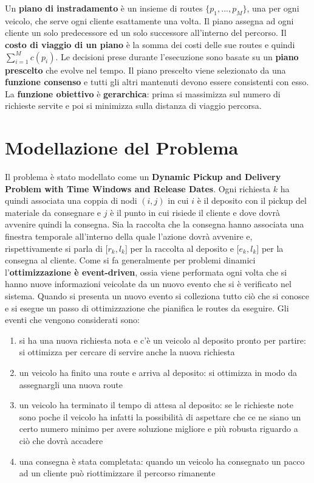 \documentclass[
    article,            %
    12pt,                %
    oneside,            %
    a4paper,            %
    english,            %
    italian,                %
    sumario=tradicional,
]{abntex2}
\begin{document}
\newline
Un \textbf{piano di instradamento} è un insieme di routes $\{p_1,...,p_M\}$, una per ogni veicolo, che serve ogni cliente esattamente una volta. Il piano assegna ad ogni cliente un solo predecessore ed un solo successore all'interno del percorso.  Il \textbf{costo di viaggio di un piano} è la somma dei costi delle sue routes e quindi $\sum_{i=1}^M c(p_i)$. Le decisioni prese durante l'esecuzione sono basate su un \textbf{piano prescelto} che evolve nel tempo. Il piano prescelto viene selezionato da una \textbf{funzione consenso} e tutti gli altri mantenuti devono essere consistenti con esso.
\newline
La \textbf{funzione obiettivo} è \textbf{gerarchica}: prima si massimizza sul numero di richieste servite e poi si minimizza sulla distanza di viaggio percorsa.

\hypertarget{modellazione-del-problema}{%
\section{Modellazione del Problema}\label{modellazione-del-problema}}

Il problema è stato modellato come un \textbf{Dynamic Pickup and Delivery Problem with Time Windows and Release Dates}. Ogni richiesta {\(k\)} ha quindi associata una coppia di nodi {\((i,j)\)} in cui {\(i\)} è il deposito con il pickup del materiale da consegnare e {\(j\)} è il punto in cui risiede il cliente e dove dovrà avvenire quindi la consegna. Sia la raccolta che la consegna hanno associata una finestra temporale all'interno della quale l'azione dovrà avvenire e, rispettivamente si parla di {\(\lbrack r_{k},l_{k}\rbrack\)} per la raccolta al deposito e {\(\lbrack e_{k},l_{k}\rbrack\)} per la consegna al cliente. Come si fa generalmente per problemi dinamici l'\textbf{ottimizzazione è event-driven}, ossia viene performata ogni volta che si hanno nuove informazioni veicolate da un nuovo evento che si è verificato nel sistema. Quando si presenta un nuovo evento si colleziona tutto ciò che si conosce e si esegue un passo di ottimizzazione che pianifica le routes da eseguire. Gli eventi che vengono considerati sono:

\begin{enumerate}
    \label{events}
    \item si ha una nuova richiesta nota e c'è un veicolo al deposito pronto per partire: si ottimizza per cercare di servire anche la nuova richiesta
    \item un veicolo ha finito una route e arriva al deposito: si ottimizza in modo da assegnargli una nuova route
    \item un veicolo ha terminato il tempo di attesa al deposito: se le richieste note sono poche il veicolo ha infatti la possibilità di aspettare che ce ne siano un certo numero minimo per avere soluzione migliore e più robusta riguardo a ciò che dovrà accadere
    \item una consegna è stata completata: quando un veicolo ha consegnato un pacco ad un cliente può riottimizzare il percorso rimanente
\end{enumerate}
\end{document}

